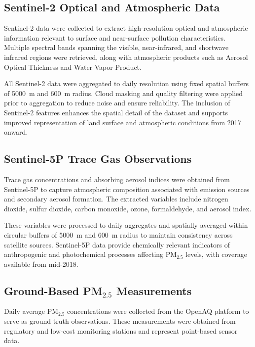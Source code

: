 \documentclass[12pt]{report}
\begin{document}
\subsection{Sentinel-2 Optical and Atmospheric Data}

Sentinel-2 data were collected to extract high-resolution optical and atmospheric information relevant to surface and near-surface pollution characteristics. Multiple spectral bands spanning the visible, near-infrared, and shortwave infrared regions were retrieved, along with atmospheric products such as Aerosol Optical Thickness and Water Vapor Product.

All Sentinel-2 data were aggregated to daily resolution using fixed spatial buffers of 5000~m and 600~m radius. Cloud masking and quality filtering were applied prior to aggregation to reduce noise and ensure reliability. The inclusion of Sentinel-2 features enhances the spatial detail of the dataset and supports improved representation of land surface and atmospheric conditions from 2017 onward.

\subsection{Sentinel-5P Trace Gas Observations}

Trace gas concentrations and absorbing aerosol indices were obtained from Sentinel-5P to capture atmospheric composition associated with emission sources and secondary aerosol formation. The extracted variables include nitrogen dioxide, sulfur dioxide, carbon monoxide, ozone, formaldehyde, and aerosol index.

These variables were processed to daily aggregates and spatially averaged within circular buffers of 5000~m and 600~m radius to maintain consistency across satellite sources. Sentinel-5P data provide chemically relevant indicators of anthropogenic and photochemical processes affecting PM$_{2.5}$ levels, with coverage available from mid-2018.

\subsection{Ground-Based PM$_{2.5}$ Measurements}

Daily average PM$_{2.5}$ concentrations were collected from the OpenAQ platform to serve as ground truth observations. These measurements were obtained from regulatory and low-cost monitoring stations and represent point-based sensor data.
\end{document}
